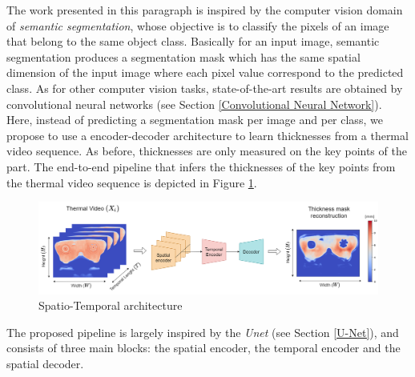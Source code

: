 The work presented in this paragraph is inspired by the computer vision domain of \textit{semantic segmentation}, whose objective is to classify  the pixels of an image that belong to the same object class. Basically for an input image, semantic segmentation produces a segmentation mask which has the same spatial dimension of the input image where each pixel value correspond to the predicted class. As for other computer vision tasks, state-of-the-art results are obtained by convolutional neural networks (see Section \ref{Convolutional Neural Network}).
Here, instead of predicting a segmentation mask per image and per class, we propose to use a encoder-decoder architecture to learn thicknesses from a thermal video sequence. As before, thicknesses are only measured on the key points of the part. The end-to-end pipeline that infers the thicknesses of the key points from the thermal video sequence is depicted in Figure \ref{fig:spatio_temporal_architecture}.
%
\begin{figure}
\centering
\includegraphics[scale=0.35]{images/chapter_4/Spatio-Temporal.png}
\caption{Spatio-Temporal architecture}
\label{fig:spatio_temporal_architecture}
\end{figure}
%
The proposed pipeline is largely inspired by the \textit{Unet} (see Section \ref{U-Net}), and consists of three main blocks: the spatial encoder, the temporal encoder and the spatial decoder. 

